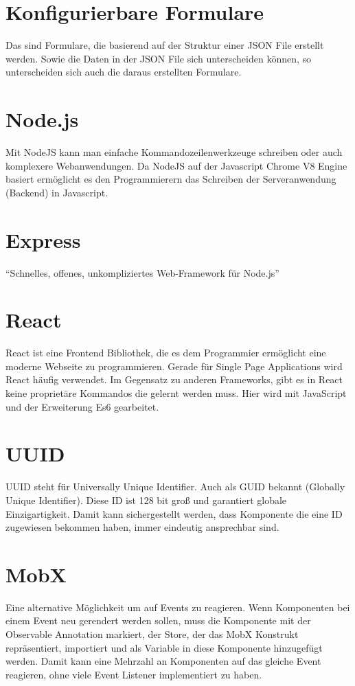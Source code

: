 \documentclass[a4paper,11pt]{scrreprt}
\begin{document}
\section{Konfigurierbare Formulare}
Das sind Formulare, die basierend auf der Struktur einer JSON File erstellt werden. Sowie die Daten in der JSON File sich unterscheiden können, so unterscheiden sich auch die daraus erstellten Formulare.


\section{Node.js}
Mit NodeJS kann man einfache Kommandozeilenwerkzeuge schreiben oder auch
komplexere Webanwendungen. Da NodeJS auf der Javascript Chrome V8 Engine basiert
ermöglicht es den Programmierern das Schreiben der Serveranwendung (Backend) in
Javascript. \cite{Weiss2019}

\section{Express}
“Schnelles, offenes, unkompliziertes Web-Framework für Node.js” \cite{None2019}

\section{React}
React ist eine Frontend Bibliothek, die es dem Programmier ermöglicht eine moderne Webseite zu programmieren. 
Gerade für Single Page Applications wird React häufig verwendet. Im Gegensatz zu anderen Frameworks, gibt es in React keine proprietäre Kommandos die gelernt werden muss. Hier wird mit JavaScript und der Erweiterung Es6 gearbeitet. 


\section{UUID}
UUID steht für Universally Unique Identifier. Auch als GUID bekannt (Globally Unique Identifier). Diese ID ist 128 bit groß und garantiert globale Einzigartigkeit. \cite{rfc4122} Damit kann sichergestellt werden, dass Komponente die eine ID zugewiesen bekommen haben, immer eindeutig ansprechbar sind.

\section{MobX}
Eine alternative Möglichkeit um auf Events zu reagieren. 
Wenn Komponenten bei einem Event neu gerendert werden sollen, muss die Komponente mit der Observable Annotation markiert, der Store, der das MobX Konstrukt repräsentiert, importiert und als Variable in diese Komponente hinzugefügt werden. 
Damit kann eine Mehrzahl an Komponenten auf das gleiche Event reagieren, ohne viele Event Listener implementiert zu haben.
\end{document}
